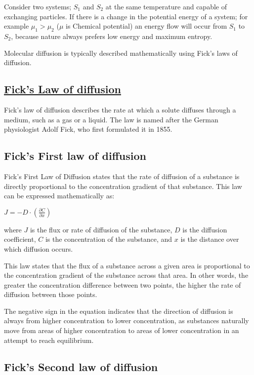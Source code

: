 \documentclass[12pt, a4paper]{article} %
\begin{document}
Consider two systems; $S_1$ and $S_2$ at the same temperature and capable of exchanging particles. If there is a change in the potential energy of a system; for example $\mu_1>\mu_2$ ($\mu$ is Chemical potential) an energy flow will occur from $S_1$ to $S_2$, because nature always prefers low energy and maximum entropy.

Molecular diffusion is typically described mathematically using Fick's laws of diffusion.

\subsection*{\underline{Fick's Law of diffusion}}

Fick's law of diffusion describes the rate at which a solute diffuses through a medium, such as a gas or a liquid. The law is named after the German physiologist Adolf Fick, who first formulated it in 1855.

\subsection*{Fick's First law of diffusion}

Fick's First Law of Diffusion states that the rate of diffusion of a substance is directly proportional to the concentration gradient of that substance. This law can be expressed mathematically as:

$J = -D \cdot \left(\frac{\partial C}{\partial x}\right)$

where $J$ is the flux or rate of diffusion of the substance, $D$ is the diffusion coefficient, $C$ is the concentration of the substance, and $x$ is the distance over which diffusion occurs.

This law states that the flux of a substance across a given area is proportional to the concentration gradient of the substance across that area. In other words, the greater the concentration difference between two points, the higher the rate of diffusion between those points.

The negative sign in the equation indicates that the direction of diffusion is always from higher concentration to lower concentration, as substances naturally move from areas of higher concentration to areas of lower concentration in an attempt to reach equilibrium.

\subsection*{Fick's Second law of diffusion}
\end{document}
